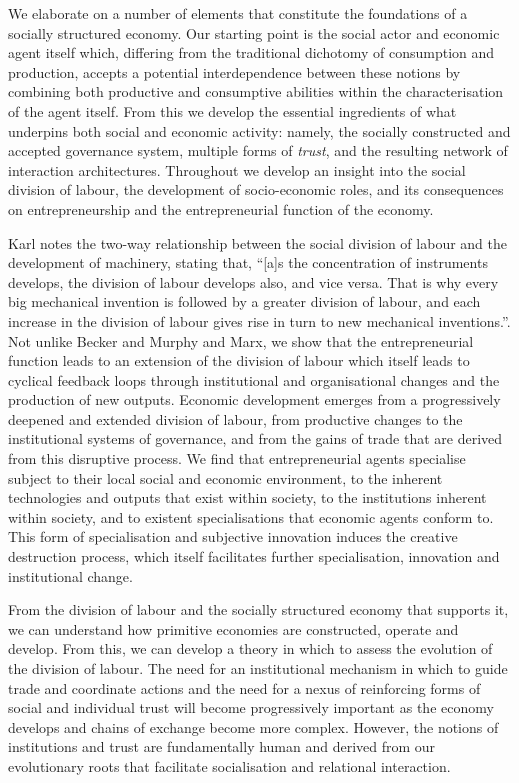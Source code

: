 We elaborate on a number of elements that constitute the foundations of a socially structured economy. Our starting point is the social actor and economic agent itself which, differing from the traditional dichotomy of consumption and production, accepts a potential interdependence between these notions by combining both productive and consumptive abilities within the characterisation of the agent itself. From this we develop the essential ingredients of what underpins both social and economic activity: namely, the socially constructed and accepted governance system, multiple forms of \emph{trust}, and the resulting network of interaction architectures. Throughout we develop an insight into the social division of labour, the development of socio-economic roles, and its consequences on entrepreneurship and the entrepreneurial function of the economy.

Karl \citet[p.~139]{Marx1847} notes the two-way relationship between the social division of labour and the development of machinery, stating that, ``[a]s the concentration of instruments develops, the division of labour develops also, and vice versa. That is why every big mechanical invention is followed by a greater division of labour, and each increase in the division of labour gives rise in turn to new mechanical inventions.''. Not unlike Becker and Murphy and Marx, we show that the entrepreneurial function leads to an extension of the division of labour which itself leads to cyclical feedback loops through institutional and organisational changes and the production of new outputs. Economic development emerges from a progressively deepened and extended division of labour, from productive changes to the institutional systems of governance, and from the gains of trade that are derived from this disruptive process. We find that entrepreneurial agents specialise subject to their local social and economic environment, to the inherent technologies and outputs that exist within society, to the institutions inherent within society, and to existent specialisations that economic agents conform to. This form of specialisation and subjective innovation induces the creative destruction process, which itself facilitates further specialisation, innovation and institutional change.

From the division of labour and the socially structured economy that supports it, we can understand how primitive economies are constructed, operate and develop. From this, we can develop a theory in which to assess the evolution of the division of labour. The need for an institutional mechanism in which to guide trade and coordinate actions and the need for a nexus of reinforcing forms of social and individual trust will become progressively important as the economy develops and chains of exchange become more complex. However, the notions of institutions and trust are fundamentally human and derived from our evolutionary roots that facilitate socialisation and relational interaction.

